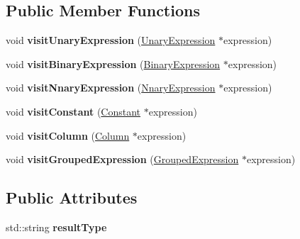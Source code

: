 \subsection*{Public Member Functions}
\begin{DoxyCompactItemize}
\item 
\hypertarget{class_type_resolving_expression_visitor_a9ae5e5542bbcdfbf81c7c6efb5b3e4fe}{void {\bfseries visit\+Unary\+Expression} (\hyperlink{class_unary_expression}{Unary\+Expression} $\ast$expression)}\label{class_type_resolving_expression_visitor_a9ae5e5542bbcdfbf81c7c6efb5b3e4fe}

\item 
\hypertarget{class_type_resolving_expression_visitor_a6f4aca2ea71660065b44815b2a7e6bd8}{void {\bfseries visit\+Binary\+Expression} (\hyperlink{class_binary_expression}{Binary\+Expression} $\ast$expression)}\label{class_type_resolving_expression_visitor_a6f4aca2ea71660065b44815b2a7e6bd8}

\item 
\hypertarget{class_type_resolving_expression_visitor_a75c505a51dc15d3d4a7c2e5c539f04e7}{void {\bfseries visit\+Nnary\+Expression} (\hyperlink{class_nnary_expression}{Nnary\+Expression} $\ast$expression)}\label{class_type_resolving_expression_visitor_a75c505a51dc15d3d4a7c2e5c539f04e7}

\item 
\hypertarget{class_type_resolving_expression_visitor_a7c5f29e6a4331aafc5bba63e3af64ecd}{void {\bfseries visit\+Constant} (\hyperlink{class_constant}{Constant} $\ast$expression)}\label{class_type_resolving_expression_visitor_a7c5f29e6a4331aafc5bba63e3af64ecd}

\item 
\hypertarget{class_type_resolving_expression_visitor_a1ea3d7f6a0ebd1296df38d71420596bd}{void {\bfseries visit\+Column} (\hyperlink{class_column}{Column} $\ast$expression)}\label{class_type_resolving_expression_visitor_a1ea3d7f6a0ebd1296df38d71420596bd}

\item 
\hypertarget{class_type_resolving_expression_visitor_a51d54742c7529b2e14b1e3b1ded6c806}{void {\bfseries visit\+Grouped\+Expression} (\hyperlink{class_grouped_expression}{Grouped\+Expression} $\ast$expression)}\label{class_type_resolving_expression_visitor_a51d54742c7529b2e14b1e3b1ded6c806}

\end{DoxyCompactItemize}
\subsection*{Public Attributes}
\begin{DoxyCompactItemize}
\item 
\hypertarget{class_type_resolving_expression_visitor_a0dee132681e536fb683694a3e7c54e32}{std\+::string {\bfseries result\+Type}}\label{class_type_resolving_expression_visitor_a0dee132681e536fb683694a3e7c54e32}

\end{DoxyCompactItemize}


